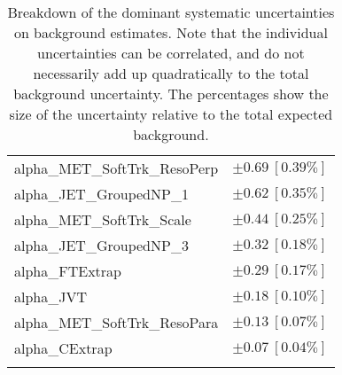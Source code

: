 \begin{table}
\begin{center}
\begin{tabular*}{\textwidth}{@{\extracolsep{\fill}}lc}
alpha\_MET\_SoftTrk\_ResoPerp         & $\pm 0.69\ [0.39\%] $       \\
alpha\_JET\_GroupedNP\_1         & $\pm 0.62\ [0.35\%] $       \\
alpha\_MET\_SoftTrk\_Scale         & $\pm 0.44\ [0.25\%] $       \\
alpha\_JET\_GroupedNP\_3         & $\pm 0.32\ [0.18\%] $       \\
alpha\_FTExtrap         & $\pm 0.29\ [0.17\%] $       \\
alpha\_JVT         & $\pm 0.18\ [0.10\%] $       \\
alpha\_MET\_SoftTrk\_ResoPara         & $\pm 0.13\ [0.07\%] $       \\
alpha\_CExtrap         & $\pm 0.07\ [0.04\%] $       \\
\noalign{\smallskip}\hline\noalign{\smallskip}
\end{tabular*}
\end{center}
\caption[Breakdown of uncertainty on background estimates]{
Breakdown of the dominant systematic uncertainties on background estimates.
Note that the individual uncertainties can be correlated, and do not necessarily add up quadratically to 
the total background uncertainty. The percentages show the size of the uncertainty relative to the total expected background.
\label{table.results.bkgestimate.uncertainties.SRB_T0}}
\end{table}
%